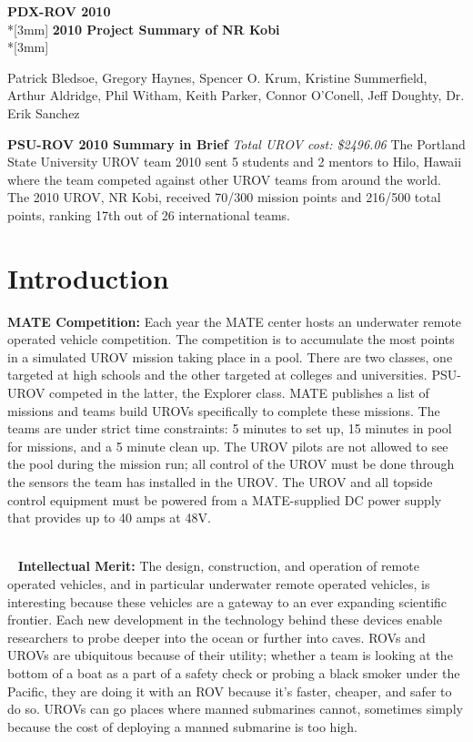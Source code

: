 \documentclass{proposalnsf}
\begin{document}
\begin{center}
{\Large{\bf PDX-ROV 2010}}\\*[3mm]
{\bf 2010 Project Summary of NR Kobi} \\*[3mm]

Patrick Bledsoe, Gregory Haynes, Spencer O. Krum, Kristine Summerfield, Arthur Aldridge, Phil Witham, Keith Parker, Connor O'Conell, Jeff Doughty, Dr. Erik Sanchez

\end{center}

\noindent
{\bf PSU-ROV 2010 Summary in Brief}
{\it Total UROV cost: \$2496.06}
The Portland State University UROV team 2010 sent 5 students and 2 mentors to Hilo, Hawaii where the team competed against other UROV teams from around the world. The 2010 UROV, NR Kobi, received 70/300 mission points and 216/500 total points, 
ranking 17th out of 26 international teams.


\section{Introduction}
\noindent
{\bf MATE Competition:}
Each year the MATE center hosts an underwater remote operated vehicle competition. The competition is to accumulate the most points
in a simulated UROV mission taking place in a pool. There are two classes, one targeted at high schools and 
the other targeted at colleges and universities. PSU-UROV competed in the latter, the Explorer class. MATE 
publishes a list of missions and teams build UROVs specifically to complete these missions. The teams are under strict
 time constraints: 5 minutes to set up, 15 minutes in pool for missions, and a 5 minute clean up. The UROV pilots are not allowed to see the pool during the mission run; all 
control of the UROV must be done through the sensors the team has installed in the UROV. The UROV and all topside control equipment must be 
powered from a MATE-supplied DC power supply that provides up to 40 amps at 48V.

\ \\\ 
\noindent
{\bf Intellectual Merit:}
The design, construction, and operation of remote operated vehicles, and in particular underwater remote operated vehicles, is interesting
because these vehicles are a gateway to an ever expanding scientific frontier. Each new development in the technology behind these devices enable 
researchers to probe deeper into the ocean or further into caves. ROVs and UROVs are ubiquitous because 
of their utility; whether a team is looking at the bottom of a boat as a part of a safety check or probing a black smoker under the Pacific, 
they are doing it with an ROV because it's faster, cheaper, and safer to do so. UROVs can go places where manned submarines cannot, sometimes 
simply because the cost of deploying a manned submarine is too high.  
\ \\
\end{document}
